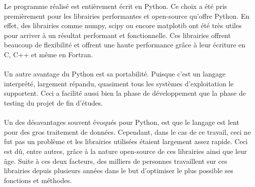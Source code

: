 \documentclass[11pt]{article}
\begin{document}
Le programme réalisé est entièrement écrit en Python.
Ce choix a été pris premièrement pour les librairies performantes et open-source qu'offre Python.
En effet, des librairies comme numpy, scipy ou encore matplotib ont été très utiles pour arriver à un résultat performant et fonctionnelle.
Ces librairies offrent beaucoup de flexibilité et offrent une haute performance grâce à leur écriture en C, C++ et même en Fortran.\\
\\
Un autre avantage du Python est sa portabilité.
Puisque c'est un langage interprété, largement répandu, quasiment tous les systèmes d'exploitation le supportent.
Ceci a facilité aussi bien la phase de développement que la phase de testing du projet de fin d'études.\\
\\
Un des désavantages souvent évoqués pour Python, est que le langage est lent pour des gros traitement de données.
Cependant, dans le cas de ce travail, ceci ne fut pas un problème et les librairies utilisées étaient largement assez rapide.
Ceci est dû, entre autres, grâce à la nature open-source de ces librairies ainsi que leur âge.
Suite à ces deux facteurs, des milliers de personnes travaillent sur ces librairies depuis plusieurs années dans le but d'optimiser le plus possible ses fonctions et méthodes.

\end{document}

